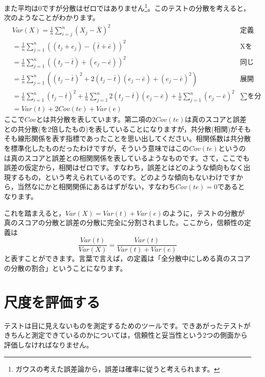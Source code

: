 \documentclass{ltjsbook}
\begin{document}
また平均は$0$ですが分散はゼロではありません\footnote{ガウスの考えた誤差論から，誤差は確率に従うと考えられます。}。このテストの分散を考えると，次のようなことがわかります。
\begin{align*}
	 & Var(X)  =  \frac{1}{n}\sum_{i=j}^n (X_j - \bar{X})^2                                                                                              & \mbox{定義より}         \\
	 & = \frac{1}{n}\sum_{j=1}^n  ((t_j + e_j) - (\bar{t} + \bar{e}))^2                                                                                  & \mbox{Xをテスト理論のモデルに} \\
	 & = \frac{1}{n}\sum_{j=1}^n (  (t_j - \bar{t}) + (e_j - \bar{e}) )^2                                                                                & \mbox{同じ記号でまとめる}    \\
	 & = \frac{1}{n}\sum_{j=1}^n (  (t_j - \bar{t})^2 + 2(t_j - \bar{t})(e_j - \bar{e}) + (e_j - \bar{e})^2  )                                           & \mbox{展開する}         \\
	 & = \frac{1}{n}\sum_{i=1}^n (t_j - \bar{t})^2 +\frac{1}{n}\sum_{j=1}^n 2(t_j - \bar{t})(e_j - \bar{e})  + \frac{1}{n}\sum_{j=1}^n (e_j - \bar{e})^2 & \mbox{$\sum$を分配}    \\
	 & =  Var(t) + 2Cov(te) + Var(e)
\end{align*}
ここで$Cov$とは共分散を表しています。第二項の$2Cov(te)$は真のスコアと誤差との共分散(を2倍したもの)を表していることになりますが，共分散(相関)がそもそも線形関係を表す指標であったことを思い出してください。相関係数は共分散を標準化したものだったわけですが，そういう意味ではこの$Cov(te)$というのは真のスコアと誤差との相関関係を表しているようなものです。さて，ここでも誤差の仮定から，相関はゼロです。すなわち，誤差とはどのような傾向もなく出現するもの，という考えられているのです。どのような傾向もないわけですから，当然なにかと相関関係にあるはずがない，すなわち$Cov(te)=0$であるとなります。

これを踏まえると，$Var(X)=Var(t)+Var(e)$のように，テストの分散が真のスコアの分散と誤差の分散に完全に分割されました。ここから，信頼性の定義は
$$\frac{Var(t)}{Var(X)}=\frac{Var(t)}{Var(t)+Var(e)}$$
と表すことができます。言葉で言えば，の定義は「全分散中にしめる真のスコアの分散の割合」ということになります。

\section{尺度を評価する}
テストは目に見えないものを測定するためのツールです。できあがったテストがきちんと測定できているのかについては，信頼性と妥当性という2つの側面から評価しなければなりません。
\end{document}
